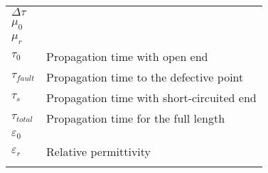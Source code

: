 \begin{longtable}[l]{@{}ll@{}}
    \( \Delta \tau \) & \\
    \( \mu_0 \) & \\
    \( \mu_r \) & \\
    \( \tau_0 \) & Propagation time with open end\\
    \( \tau_{fault} \) & Propagation time to the defective point\\
    \( \tau_s \) & Propagation time with short-circuited end\\
    \( \tau_{total} \) & Propagation time for the full length\\
    \( \varepsilon_0 \) & \\
    \( \varepsilon_r \) & Relative permittivity\\
    \label{tab:glossar}
\end{longtable}